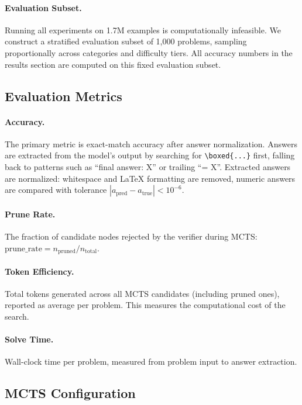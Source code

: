 \documentclass[11pt,a4paper]{article}
\begin{document}
\paragraph{Evaluation Subset.}
Running all experiments on 1.7M examples is computationally infeasible. We
construct a stratified evaluation subset of 1,000 problems, sampling
proportionally across categories and difficulty tiers. All accuracy numbers
in the results section are computed on this fixed evaluation subset.

\subsection{Evaluation Metrics}

\paragraph{Accuracy.}
The primary metric is exact-match accuracy after answer normalization. Answers
are extracted from the model's output by searching for \verb|\boxed{...}| first,
falling back to patterns such as ``final answer: X'' or trailing ``= X''.
Extracted answers are normalized: whitespace and LaTeX formatting are removed,
numeric answers are compared with tolerance $|a_{\text{pred}} - a_{\text{true}}|
< 10^{-6}$.

\paragraph{Prune Rate.}
The fraction of candidate nodes rejected by the verifier during MCTS:
$\text{prune\_rate} = n_{\text{pruned}} / n_{\text{total}}$.

\paragraph{Token Efficiency.}
Total tokens generated across all MCTS candidates (including pruned ones),
reported as average per problem. This measures the computational cost of the
search.

\paragraph{Solve Time.}
Wall-clock time per problem, measured from problem input to answer extraction.

\subsection{MCTS Configuration}
\end{document}
